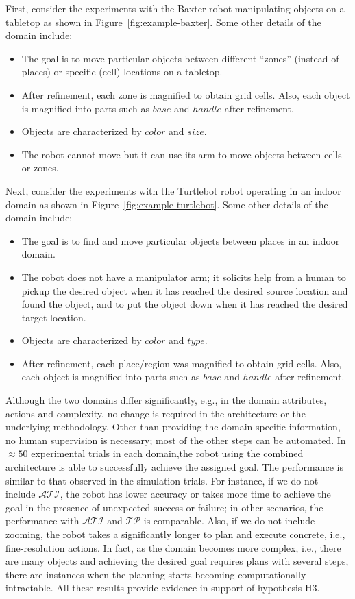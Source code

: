 \documentclass[letterpaper, 10 pt, conference]{article}  %
\begin{document}
First, consider the experiments with the Baxter robot manipulating
objects on a tabletop as shown in Figure~\ref{fig:example-baxter}.
Some other details of the domain include:
\begin{itemize}
\item The goal is to move particular objects between different
  ``zones'' (instead of places) or specific (cell) locations on a
  tabletop.
\item After refinement, each zone is magnified to obtain grid cells.
  Also, each object is magnified into parts such as $base$ and
  $handle$ after refinement.
\item Objects are characterized by $color$ and $size$.
\item The robot cannot move but it can use its arm to move objects
  between cells or zones.
\end{itemize}

Next, consider the experiments with the Turtlebot robot operating in
an indoor domain as shown in Figure~\ref{fig:example-turtlebot}. Some
other details of the domain include:
\begin{itemize}
\item The goal is to find and move particular objects between places
  in an indoor domain.
\item The robot does not have a manipulator arm; it solicits help from
  a human to pickup the desired object when it has reached the desired
  source location and found the object, and to put the object down
  when it has reached the desired target location.
\item Objects are characterized by $color$ and $type$.
\item After refinement, each place/region was magnified to obtain grid
  cells. Also, each object is magnified into parts such as $base$ and
  $handle$ after refinement.
\end{itemize}
Although the two domains differ significantly, e.g., in the domain
attributes, actions and complexity, no change is required in the
architecture or the underlying methodology. Other than providing the
domain-specific information, no human supervision is necessary; most
of the other steps can be automated. In $\approx 50$ experimental
trials in each domain,the robot using the combined architecture is
able to successfully achieve the assigned goal. The performance is
similar to that observed in the simulation trials. For instance, if we
do not include $\mathcal{ATI}$, the robot has lower accuracy or takes
more time to achieve the goal in the presence of unexpected success or
failure; in other scenarios, the performance with $\mathcal{ATI}$ and
$\mathcal{TP}$ is comparable. Also, if we do not include zooming, the
robot takes a significantly longer to plan and execute concrete, i.e.,
fine-resolution actions. In fact, as the domain becomes more complex,
i.e., there are many objects and achieving the desired goal requires
plans with several steps, there are instances when the planning starts
becoming computationally intractable. All these results provide
evidence in support of hypothesis H3.
\end{document}
